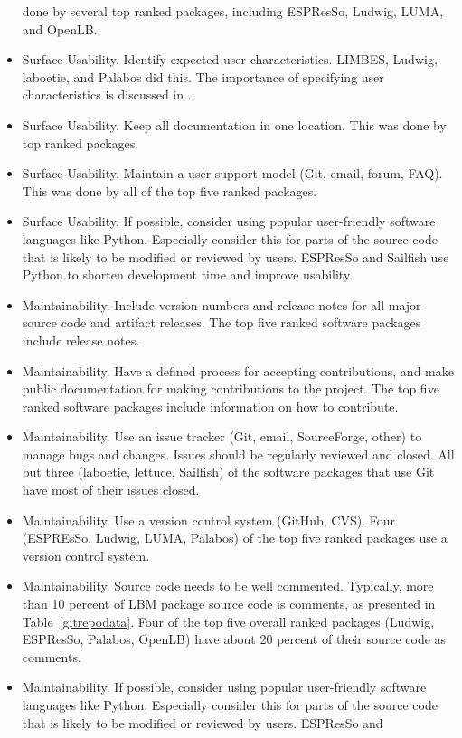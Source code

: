 \documentclass[final, 3p, times, authoryear]{elsarticle}
\begin{document}
\begin{itemize}
	done by several top ranked packages, including ESPResSo, Ludwig, LUMA, and
	OpenLB.
	\item Surface Usability. Identify expected user characteristics. LIMBES,
	Ludwig, laboetie, and Palabos did this. The importance of specifying user
	characteristics is discussed in \citep{smith2007requirements}.
	\item Surface Usability. Keep all documentation in one location. This was
	done by top ranked packages.
	\item Surface Usability. Maintain a user support model (Git, email, forum,
	FAQ). This was done by all of the top five ranked packages.
	\item Surface Usability. If possible, consider using popular user-friendly
	software languages like Python. Especially consider this for parts of the
	source code that is likely to be modified or reviewed by users. ESPResSo and
	Sailfish use Python to shorten development time and improve usability.
	\item Maintainability. Include version numbers and release notes for all
	major source code and artifact releases. The top five ranked software
	packages include release notes.
	\item Maintainability. Have a defined process for accepting contributions,
	and make public documentation for making contributions to the project. The
	top five ranked software packages include information on how to contribute. 
	\item Maintainability. Use an issue tracker (Git, email, SourceForge, other)
	to manage bugs and changes. Issues should be regularly reviewed and closed.
	All but three (laboetie, lettuce, Sailfish) of the software packages that
	use Git have most of their issues closed.
	\item Maintainability. Use a version control system (GitHub, CVS). Four
	(ESPREsSo, Ludwig, LUMA, Palabos) of the top five ranked packages use a
	version control system.
	\item Maintainability. Source code needs to be well commented. Typically,
	more than 10 percent of LBM package source code is comments, as presented in
	Table~\ref{gitrepodata}. Four of the top five overall ranked packages
	(Ludwig, ESPResSo, Palabos, OpenLB) have about 20 percent of their source
	code as comments.
	\item Maintainability. If possible, consider using popular user-friendly
	software languages like Python. Especially consider this for parts of the
	source code that is likely to be modified or reviewed by users. ESPResSo and

\end{itemize}
\end{document}
